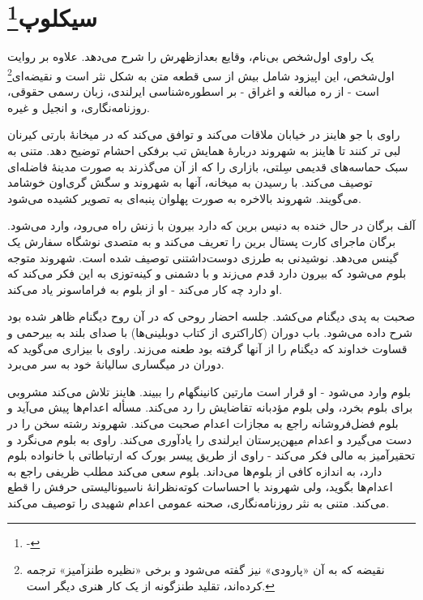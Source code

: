\documentclass[12pt]{book}
\begin{document}
    \chapter[سیکلوپ]{سیکلوپ\protect\footnote{-}}\label{ep:12}
    یک راوی اول‌شخص بی‌نام، وقایع بعدازظهرش را شرح می‌دهد. علاوه بر روایت اول‌شخص، این اپیزود شامل بیش از سی قطعه متن به شکل نثر است و نقیضه‌ای\footnote{نقیضه که به آن «پارودی» نیز گفته می‌شود و برخی «نظیره طنزآمیز» ترجمه کرده‌اند، تقلید طنزگونه از یک کار هنری دیگر است.} است - از ره مبالغه و اغراق - بر اسطوره‌شناسی ایرلندی، زبان رسمی حقوقی، روزنامه‌نگاری، و انجیل و غیره.

    راوی با جو هاینز در خیابان ملاقات می‌کند و توافق می‌کند که در میخانۀ بارتی کیرنان لبی تر کنند تا هاینز به شهروند دربارۀ همایش تب برفکی احشام توضیح دهد. متنی به سبک حماسه‌های قدیمی سِلتی، بازاری را که از آن می‌گذرند به صورت مدینۀ فاضله‌ای توصیف می‌کند. با رسیدن به میخانه، آنها به شهروند و سگش گری‌اون خوشامد می‌گویند. شهروند بالاخره به صورت پهلوان پنبه‌ای به تصویر کشیده می‌شود.

    آلف برگان در حال خنده به دنیس برین که دارد بیرون با زنش راه می‌رود، وارد می‌شود. برگان ماجرای کارت پستال  برین را تعریف می‌کند و به متصدی نوشگاه سفارش یک گینس می‌دهد. نوشیدنی به طرزی دوست‌داشتنی توصیف شده است. شهروند متوجه بلوم می‌شود که بیرون دارد قدم می‌زند و با دشمنی و کینه‌توزی به این فکر می‌کند که او دارد چه کار می‌کند - او از بلوم به فراماسونر یاد می‌کند.

    صحبت به پدی دیگنام می‌کشد. جلسه احضار روحی که در آن روح دیگنام ظاهر شده بود شرح داده می‌شود. باب دوران (کاراکتری از کتاب دوبلینی‌ها) با صدای بلند به بیرحمی و قساوت خداوند که دیگنام را از آنها گرفته بود طعنه می‌زند. راوی با بیزاری می‌گوید که دوران در میگساری سالیانۀ خود به سر می‌برد.

    بلوم وارد می‌شود - او قرار است مارتین کانینگهام را ببیند. هاینز تلاش می‌کند مشروبی برای بلوم بخرد، ولی بلوم مؤدبانه تقاضایش را رد می‌کند. مسأله اعدام‌ها پیش می‌آید و بلوم فضل‌فروشانه راجع به مجازات اعدام صحبت می‌کند. شهروند رشته سخن را در دست می‌گیرد و اعدام میهن‌پرستان ایرلندی را یادآوری می‌کند. راوی به بلوم می‌نگرد و تحقیرآمیز به مالی فکر می‌کند - راوی از طریق پیسر بورک که ارتباطاتی با خانواده بلوم دارد، به اندازه کافی از بلوم‌ها می‌داند. بلوم سعی می‌کند مطلب ظریفی راجع به اعدام‌ها بگوید، ولی شهروند با احساسات کوته‌نظرانۀ ناسیونالیستی حرفش را قطع می‌کند. متنی به نثر روزنامه‌نگاری، صحنه عمومی اعدام شهیدی را توصیف می‌کند.
\end{document}
